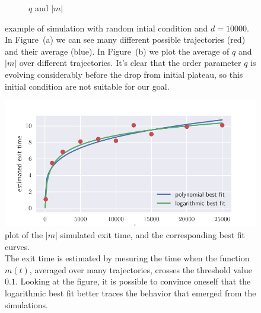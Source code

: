 \begin{figure}
\begin{subfigure}{0.495\textwidth}
    \caption{\(q\) and \(|m|\)}
  \end{subfigure}
  \caption{
    example of simulation with random intial condition and \(d=10000\).\\
    In Figure~(a) we can see many different possible trajectories (red) and their average (blue).
    In Figure~(b) we plot the average of \(q\) and \(|m|\) over different trajectories.
    It's clear that the order parameter \(q\) is evolving considerably before the drop from initial
    plateau, so this initial condition are not suitable for our goal.
  }
  \label{fig:unconstraned-random-example}
\end{figure}
\begin{figure}
  \centering
  \includegraphics[width=\textwidth]{figures/unconstraned-phase-retrivial-exittimes.pdf}
  \caption{
    plot of the \(|m|\) simulated exit time, and the corresponding best fit curves.\\
    The exit time is estimated by mesuring the time when the function \(m(t)\), averaged over many trajectories,
    crosses the threshold value \(0.1\).
    Looking at the figure, it is possible to convince oneself that 
    the logarithmic best fit better traces the behavior that emerged from the simulations. 
  }
  \label{fig:unconstraned-random-m-exit-time} 
\end{figure}
\FloatBarrier %

